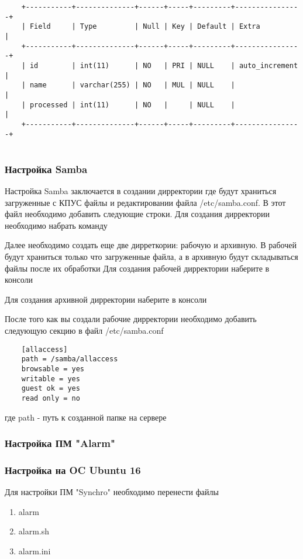 \documentclass[12pt]{article}[a4paper,14pt,russian]
\begin{document}
	\begin{verbatim}
	+-----------+--------------+------+-----+---------+----------------+
	| Field     | Type         | Null | Key | Default | Extra          |
	+-----------+--------------+------+-----+---------+----------------+
	| id        | int(11)      | NO   | PRI | NULL    | auto_increment |
	| name      | varchar(255) | NO   | MUL | NULL    |                |
	| processed | int(11)      | NO   |     | NULL    |                |
	+-----------+--------------+------+-----+---------+----------------+
	
	\end{verbatim}
	\subsubsection {Настройка Samba}
	Настройка Samba заключается в создании дирректории где будут храниться загруженные с КПУС файлы и редактировании файла /etc/samba.conf. В этот файл необходимо добавить следующие строки.
	Для создания дирректории необходимо набрать команду
	\begin{center}


	\end{center}
	Далее необходимо создать еще две дирреткории: рабочую и архивную. В рабочей будут храниться только что загруженные файла, а в архивную будут складываться файлы после их обработки
	Для создания рабочей дирректории наберите в консоли
	\begin{center}
	\end{center}
	Для создания архивной дирректории наберите в консоли
	\begin{center}
	\end{center}
	После того как вы создали рабочие дирректории необходимо добавить следующую секцию в файл /etc/samba.conf
	\begin {verbatim}
	[allaccess]
	path = /samba/allaccess
	browsable = yes
	writable = yes
	guest ok = yes
	read only = no
	\end{verbatim}
	где path - путь к созданной папке на сервере
	
	\subsubsection{Настройка ПМ "Alarm"}
	\subsubsection{Настройка на OC Ubuntu 16}
	Для настройки ПМ "Synchro" необходимо перенести файлы
	\begin{enumerate}
	\item alarm
	\item alarm.sh
	\item alarm.ini
	\end{enumerate}
	
\end{document}

